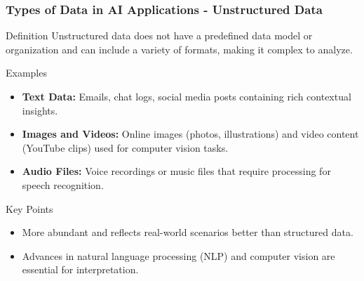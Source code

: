 \documentclass[aspectratio=169]{beamer}
\begin{document}
\begin{frame}[fragile]
    \frametitle{Types of Data in AI Applications - Unstructured Data}
    \begin{block}{Definition}
        Unstructured data does not have a predefined data model or organization and can include a variety of formats, making it complex to analyze.
    \end{block}
    
    \begin{block}{Examples}
        \begin{itemize}
            \item \textbf{Text Data:} Emails, chat logs, social media posts containing rich contextual insights.
            \item \textbf{Images and Videos:} Online images (photos, illustrations) and video content (YouTube clips) used for computer vision tasks.
            \item \textbf{Audio Files:} Voice recordings or music files that require processing for speech recognition.
        \end{itemize}
    \end{block}
    
    \begin{block}{Key Points}
        \begin{itemize}
            \item More abundant and reflects real-world scenarios better than structured data.
            \item Advances in natural language processing (NLP) and computer vision are essential for interpretation.
        \end{itemize}
    \end{block}
\end{frame}
\end{document}
